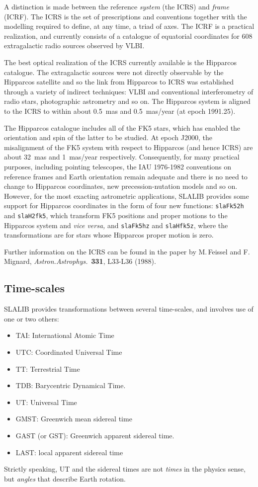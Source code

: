 \documentclass[11pt,fleqn,twoside]{article}
\renewcommand{\_}{{\tt\char'137}}     %
\begin{document}
A distinction is made between the reference {\it system}\/ (the ICRS)
and {\it frame}\/ (ICRF).  The ICRS is the set of prescriptions and
conventions together with the modelling required to define, at any
time, a triad of axes.  The ICRF is a practical realization, and
currently consists of a catalogue of equatorial coordinates for 608
extragalactic radio sources observed by VLBI.
 
The best optical realization of the ICRS currently available is the
Hipparcos catalogue.  The extragalactic sources were not directly
observable by the Hipparcos satellite and so the link from Hipparcos
to ICRS was established through a variety of indirect techniques: VLBI and
conventional interferometry of radio stars, photographic astrometry
and so on.  The Hipparcos system is aligned to the ICRS to within about
0.5~mas and 0.5~mas/year (at epoch 1991.25).
 
The Hipparcos catalogue includes all of the FK5 stars, which has enabled
the orientation and spin of the latter to be studied.  At epoch J2000,
the misalignment of the FK5 system with respect to Hipparcos
(and hence ICRS) are about 32~mas and 1~mas/year respectively.
Consequently, for many practical purposes, including pointing
telescopes, the IAU 1976-1982 conventions on reference frames and
Earth orientation remain adequate and there is no need to change to
Hipparcos coordinates, new precession-nutation models and so on.
However, for the most exacting astrometric applications, SLALIB
provides some support for Hipparcos coordinates in the form of
four new functions:
{\tt slaFk52h} and
{\tt slaH2fk5},
which transform FK5 positions and proper motions to the Hipparcos system
and {\it vice versa,}\/ and
{\tt slaFk5hz} and
{\tt slaHfk5z},
where the transformations are for stars whose Hipparcos proper motion is
zero.
 
Further information on the ICRS can be found in the paper by M.\,Feissel
and F.\,Mignard, {\it Astron.Astrophys.}~{\bf 331}, L33-L36 (1988).

\subsection{Time-scales}
SLALIB provides transformations between several time-scales, and involves
use of one or two others:
\begin{itemize}
\item TAI: International Atomic Time
\item UTC: Coordinated Universal Time
\item TT: Terrestrial Time
\item TDB: Barycentric Dynamical Time.
\item UT: Universal Time
\item GMST: Greenwich mean sidereal time
\item GAST (or GST): Greenwich apparent sidereal time.
\item LAST: local apparent sidereal time
\end{itemize}
Strictly speaking, UT and the sidereal times are not {\it times}\/ in
the physics sense, but {\it angles}\/ that describe Earth rotation.
\end{document}

